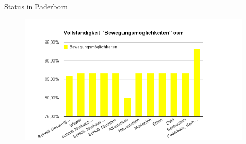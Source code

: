 \begin{frame}[t]{Status in Paderborn}
 \begin{figure}
  \centering
  \includegraphics[scale=0.5]{section_paderborn_osm_move.png}
 \end{figure}
\end{frame}